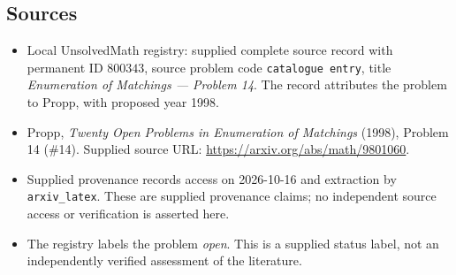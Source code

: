 \documentclass[11pt]{article}
\begin{document}
\subsection{Sources}
\begin{itemize}
\item Local UnsolvedMath registry: supplied complete source record with permanent ID \(800343\), source problem code \texttt{catalogue entry}, title \emph{Enumeration of Matchings --- Problem 14}. The record attributes the problem to Propp, with proposed year 1998.
\item Propp, \emph{Twenty Open Problems in Enumeration of Matchings} (1998), Problem 14 (\#14). Supplied source URL: \url{https://arxiv.org/abs/math/9801060}.
\item Supplied provenance records access on 2026-10-16 and extraction by \texttt{arxiv\_latex}. These are supplied provenance claims; no independent source access or verification is asserted here.
\item The registry labels the problem \emph{open}. This is a supplied status label, not an independently verified assessment of the literature.
\end{itemize}
\end{document}
